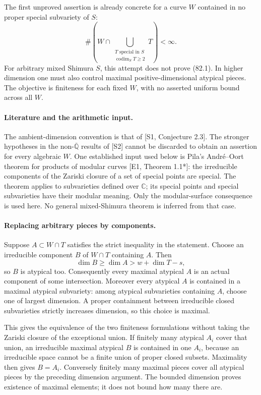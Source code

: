 \documentclass[11pt]{article}
\begin{document}
The first unproved assertion is already concrete for a curve $W$ contained in no proper special subvariety of $S$:
\[
 \#\left(W\cap\bigcup_{\substack{T\text{ special in }S\\
                         \operatorname{codim}_S T\ge2}}T\right)<\infty.
 \tag{82.1}
\]
For arbitrary mixed Shimura $S$, this attempt does not prove (82.1). In higher dimension one must also control maximal positive-dimensional atypical pieces. The objective is finiteness for each fixed $W$, with no asserted uniform bound across all $W$.

\paragraph{Literature and the arithmetic input.}
The ambient-dimension convention is that of [S1, Conjecture 2.3]. The stronger hypotheses in the non-$\overline{\mathbb Q}$ results of [S2] cannot be discarded to obtain an assertion for every algebraic $W$. One established input used below is Pila's Andr\'e--Oort theorem for products of modular curves [E1, Theorem 1.1*]: the irreducible components of the Zariski closure of a set of special points are special. The theorem applies to subvarieties defined over $\mathbb C$; its special points and special subvarieties have their modular meaning. Only the modular-surface consequence is used here. No general mixed-Shimura theorem is inferred from that case.

\paragraph{Replacing arbitrary pieces by components.}
Suppose $A\subset W\cap T$ satisfies the strict inequality in the statement. Choose an irreducible component $B$ of $W\cap T$ containing $A$. Then
\[
 \dim B\ge\dim A>w+\dim T-s,
\]
so $B$ is atypical too. Consequently every maximal atypical $A$ is an actual component of some intersection. Moreover every atypical $A$ is contained in a maximal atypical subvariety: among atypical subvarieties containing $A$, choose one of largest dimension. A proper containment between irreducible closed subvarieties strictly increases dimension, so this choice is maximal.

This gives the equivalence of the two finiteness formulations without taking the Zariski closure of the exceptional union. If finitely many atypical $A_i$ cover that union, an irreducible maximal atypical $B$ is contained in one $A_i$, because an irreducible space cannot be a finite union of proper closed subsets. Maximality then gives $B=A_i$. Conversely finitely many maximal pieces cover all atypical pieces by the preceding dimension argument. The bounded dimension proves existence of maximal elements; it does not bound how many there are.
\end{document}
